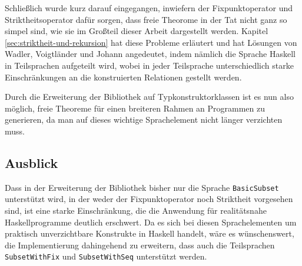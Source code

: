 Schließlich wurde kurz darauf eingegangen, inwiefern der Fixpunktoperator und Striktheitsoperator dafür sorgen,
dass freie Theorome in der Tat nicht ganz so simpel sind, wie sie im Großteil dieser Arbeit dargestellt werden. Kapitel
\ref{sec:striktheit-und-rekursion} hat diese Probleme erläutert und hat Lösungen von Wadler, Voigtländer und Johann angedeutet,
indem nämlich die Sprache Haskell in Teilsprachen aufgeteilt wird, wobei in jeder Teilsprache unterschiedlich starke Einschränkungen
an die konstruierten Relationen gestellt werden.

Durch die Erweiterung der Bibliothek auf Typkonstruktorklassen ist es nun also möglich, freie Theoreme für einen breiteren
Rahmen an Programmen zu generieren, da man auf dieses wichtige Sprachelement nicht länger verzichten muss.

\subsection{Ausblick}

Dass in der Erweiterung der Bibliothek bisher nur die Sprache \texttt{BasicSubset} unterstützt wird, in der weder der Fixpunktoperator
noch Striktheit vorgesehen sind, ist eine starke Einschränkung, die die Anwendung für realitätsnahe Haskellprogramme
deutlich erschwert. Da es sich bei diesen Sprachelementen um praktisch unverzichtbare Konstrukte
in Haskell handelt, wäre es wünschenswert, die Implementierung dahingehend zu erweitern, dass auch
die Teilsprachen \texttt{SubsetWithFix} und \texttt{SubsetWithSeq} unterstützt werden.





